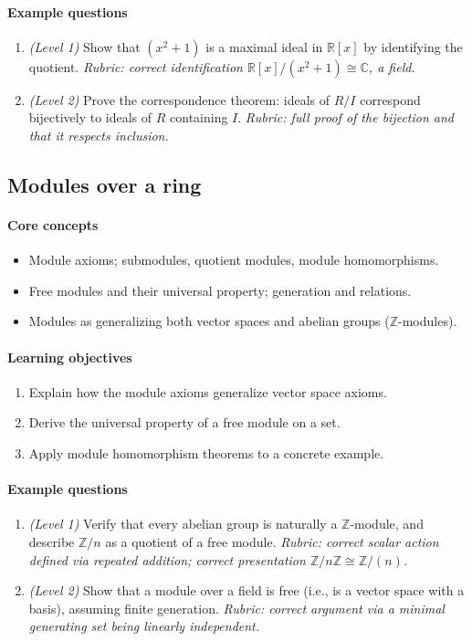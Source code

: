 \documentclass{article}
\begin{document}
\paragraph{Example questions}
\begin{enumerate}[nosep]
  \item \emph{(Level 1)} Show that $(x^2+1)$ is a maximal ideal in $\mathbb{R}[x]$ by identifying the quotient. \emph{Rubric: correct identification $\mathbb{R}[x]/(x^2+1) \cong \mathbb{C}$, a field.}
  \item \emph{(Level 2)} Prove the correspondence theorem: ideals of $R/I$ correspond bijectively to ideals of $R$ containing $I$. \emph{Rubric: full proof of the bijection and that it respects inclusion.}
\end{enumerate}

\subsection{Modules over a ring}
\paragraph{Core concepts}
\begin{itemize}[nosep]
  \item Module axioms; submodules, quotient modules, module homomorphisms.
  \item Free modules and their universal property; generation and relations.
  \item Modules as generalizing both vector spaces and abelian groups ($\mathbb{Z}$-modules).
\end{itemize}
\paragraph{Learning objectives}
\begin{enumerate}[nosep]
  \item Explain how the module axioms generalize vector space axioms.
  \item Derive the universal property of a free module on a set.
  \item Apply module homomorphism theorems to a concrete example.
\end{enumerate}
\paragraph{Example questions}
\begin{enumerate}[nosep]
  \item \emph{(Level 1)} Verify that every abelian group is naturally a $\mathbb{Z}$-module, and describe $\mathbb{Z}/n$ as a quotient of a free module. \emph{Rubric: correct scalar action defined via repeated addition; correct presentation $\mathbb{Z}/n\mathbb{Z} \cong \mathbb{Z}/(n)$.}
  \item \emph{(Level 2)} Show that a module over a field is free (i.e., is a vector space with a basis), assuming finite generation. \emph{Rubric: correct argument via a minimal generating set being linearly independent.}
\end{enumerate}
\end{document}
